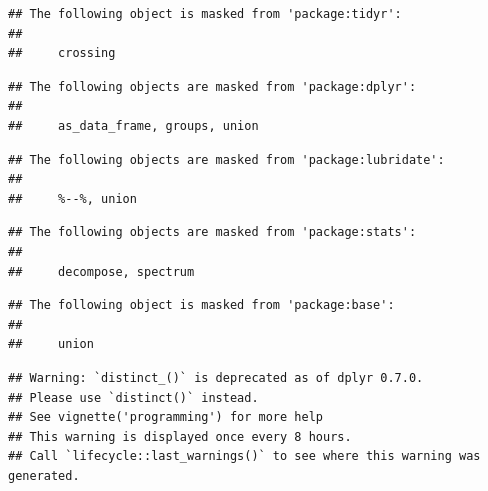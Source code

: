 \documentclass[]{tufte-book}
\newenvironment{Shaded}{}{}
\newcommand{\DataTypeTok}[1]{\textcolor[rgb]{0.56,0.13,0.00}{#1}}
\newcommand{\KeywordTok}[1]{\textcolor[rgb]{0.00,0.44,0.13}{\textbf{#1}}}
\newcommand{\NormalTok}[1]{#1}
\newcommand{\OperatorTok}[1]{\textcolor[rgb]{0.40,0.40,0.40}{#1}}
\newcommand{\OtherTok}[1]{\textcolor[rgb]{0.00,0.44,0.13}{#1}}
\newcommand{\StringTok}[1]{\textcolor[rgb]{0.25,0.44,0.63}{#1}}
\begin{document}
\begin{verbatim}
## The following object is masked from 'package:tidyr':
## 
##     crossing
\end{verbatim}

\begin{verbatim}
## The following objects are masked from 'package:dplyr':
## 
##     as_data_frame, groups, union
\end{verbatim}

\begin{verbatim}
## The following objects are masked from 'package:lubridate':
## 
##     %--%, union
\end{verbatim}

\begin{verbatim}
## The following objects are masked from 'package:stats':
## 
##     decompose, spectrum
\end{verbatim}

\begin{verbatim}
## The following object is masked from 'package:base':
## 
##     union
\end{verbatim}

\begin{Shaded}
\end{Shaded}

\begin{verbatim}
## Warning: `distinct_()` is deprecated as of dplyr 0.7.0.
## Please use `distinct()` instead.
## See vignette('programming') for more help
## This warning is displayed once every 8 hours.
## Call `lifecycle::last_warnings()` to see where this warning was generated.
\end{verbatim}
\end{document}
